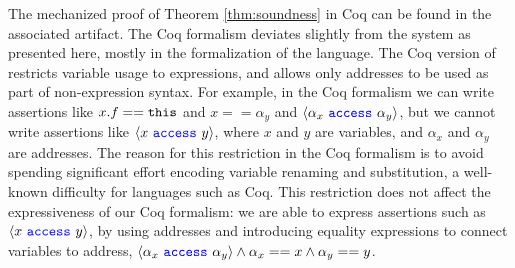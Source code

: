 
The mechanized  proof of Theorem \ref{thm:soundness} in Coq 
can be found in the associated artifact. 
The   Coq formalism deviates slightly from the system as
presented here,  mostly in the formalization of the 
\SpecO language. The Coq version of \SpecO restricts variable usage to expressions, and allows only addresses to 
be used as part of non-expression syntax. 
For example, in the Coq formalism
we can write assertions like $x.f=={\texttt{this}}$ and
$x==\alpha_y$ and  $\langle \alpha_x\ {\color{blue}\texttt{access}}\ \alpha_y \rangle$, but we cannot write assertions 
like $\langle x\ {\color{blue}\texttt{access}}\ y \rangle$, where $x$ and $y$ are variables, and $\alpha_x$ and $\alpha_y$ are
addresses.
The reason for this restriction in the Coq formalism is to avoid spending %
significant effort encoding variable
renaming and substitution, a well-known difficulty for languages such as Coq. 
This restriction does not affect the expressiveness of %
our  Coq formalism: we are
able to express assertions such as $\langle x\ {\color{blue}\texttt{access}}\ y \rangle$, by using addresses and introducing equality expressions %
to connect variables to address, \ie
 $\langle \alpha_x\ {\color{blue}\texttt{access}}\ \alpha_y \rangle \wedge \alpha_x == x \wedge \alpha_y == y$.
